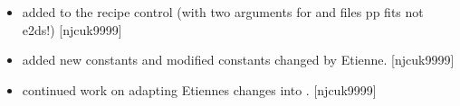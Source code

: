 \documentclass[a4paper,10pt,english]{report}
\begin{document}
\begin{itemize}
\item {} 
 \sphinxhyphen{} added  to the recipe control
(with two arguments for  and  files \sphinxhyphen{} pp fits not e2ds!)
{[}njcuk9999{]}

\item {} 
 \sphinxhyphen{} added new constants and modified constants
changed by Etienne. {[}njcuk9999{]}

\item {} 
 \sphinxhyphen{} continued work on adapting Etiennes changes
into . {[}njcuk9999{]}

\end{itemize}
\end{document}
